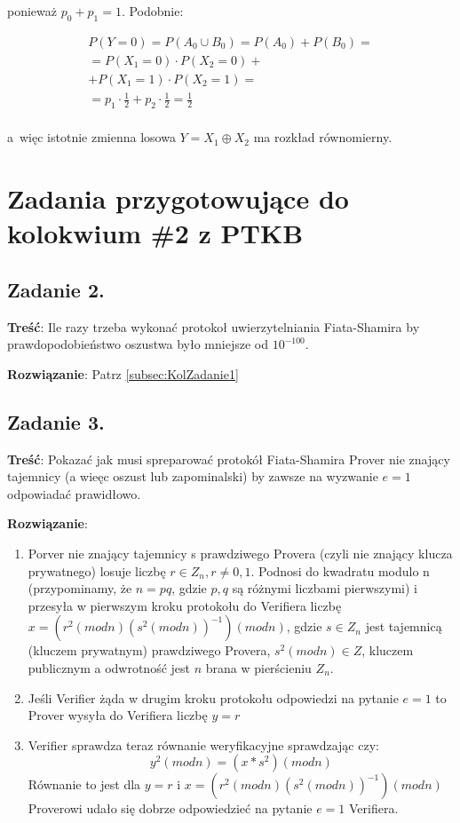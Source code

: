 \documentclass[a4paper,10pt, twocolumn]{article}
\begin{document}
\noindent ponieważ $p_{0} + p_{1} = 1$. Podobnie:

\begin{equation*}
 \begin{array}{c} P(Y = 0) = P(A_{0} \cup B_{0}) = P(A_{0}) + P(B_{0}) = \\ = P(X_{1} = 0) \cdot P(X_{2} = 0) + \\ + P(X_{1} = 1) \cdot P(X_{2} = 1) = \\ = p_{1} \cdot \frac{1}{2} + p_{2} \cdot \frac{1}{2} = \frac{1}{2} \\ \end{array}
\end{equation*}

\noindent a~więc istotnie zmienna losowa $Y = X_{1} \oplus X_{2}$ ma rozkład równomierny.

\section{Zadania przygotowujące do kolokwium \#2 z PTKB}

\subsection{Zadanie 2.}
\textbf{Treść}: Ile razy trzeba wykonać protokoł uwierzytelniania Fiata-Shamira by prawdopodobieństwo oszustwa było mniejsze od $10^{-100}$.

\textbf{Rozwiązanie}: Patrz \ref{subsec:KolZadanie1}

\subsection{Zadanie 3.}
\textbf{Treść}: Pokazać jak musi spreparować protokół Fiata-Shamira Prover nie znający tajemnicy (a wieęc oszust lub zapominalski) by zawsze na wyzwanie $e=1$ odpowiadać prawidłowo.

\textbf{Rozwiązanie}: 
\begin{enumerate}
 \item Porver nie znający tajemnicy s prawdziwego Provera (czyli nie znający klucza prywatnego) losuje liczbę $r\in Z_n, r\neq 0,1$. Podnosi do kwadratu modulo n (przypominamy, że $n=pq$, gdzie $p,q$ są różnymi liczbami pierwszymi) i przesyła w pierwszym kroku protokołu do Verifiera liczbę $x=(r^2(modn){(s^2(modn))}^{-1})(modn)$, gdzie $s \in Z_n$ jest tajemnicą (kluczem prywatnym) prawdziwego Provera, $s^2(modn)\in Z$, kluczem publicznym a odwrotność jest $n$ brana w pierścieniu $Z_n$.
 \item Jeśli Verifier żąda w drugim kroku protokołu odpowiedzi na pytanie $e=1$ to Prover wysyła do Verifiera liczbę $y=r$
 \item Verifier sprawdza teraz równanie weryfikacyjne sprawdzając czy:
  \begin{equation*}
   y^2(modn)=(x*s^2)(modn)
  \end{equation*}
  Równanie to jest dla $y=r$ i $x=(r^2(modn){(s^2(modn))}^{-1})(modn)$
  Proverowi udało się dobrze odpowiedzieć na pytanie $e=1$ Verifiera.
\end{enumerate}
\end{document}
